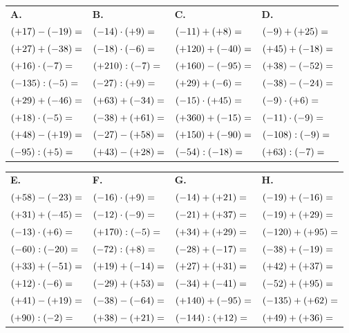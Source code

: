 {\small
\bigskip
\def\arraystretch{1.2}
\begin{tabularx}{\linewidth}{*{4}{X}}
\textbf{A.} & \textbf{B.} & \textbf{C.} & \textbf{D.} \\
$(+17)-(-19)= \dotfill$ & $(-14)\cdot(+9)= \dotfill$ & $(-11)+(+8)= \dotfill$ & $(-9)+(+25)= \dotfill$ \\
$(+27)+(-38)= \dotfill$ & $(-18)\cdot(-6)= \dotfill$ & $(+120)+(-40)= \dotfill$ & $(+45)+(-18)= \dotfill$ \\
$(+16)\cdot(-7)= \dotfill$ & $(+210):(-7)= \dotfill$ & $(+160)-(-95)= \dotfill$ & $(+38)-(-52)= \dotfill$ \\
$(-135):(-5)= \dotfill$ & $(-27):(+9)= \dotfill$ & $(+29)+(-6)= \dotfill$ & $(-38)-(-24)= \dotfill$ \\
$(+29)+(-46)= \dotfill$ & $(+63)+(-34)= \dotfill$ & $(-15)\cdot(+45)= \dotfill$ & $(-9)\cdot(+6)= \dotfill$ \\
$(+18)\cdot(-5)= \dotfill$ & $(-38)+(+61)= \dotfill$ & $(+360)+(-15)= \dotfill$ & $(-11)\cdot(-9)= \dotfill$ \\
$(+48)-(+19)= \dotfill$ & $(-27)-(+58)= \dotfill$ & $(+150)+(-90)= \dotfill$ & $(-108):(-9)= \dotfill$ \\
$(-95):(+5)= \dotfill$ & $(+43)-(+28)= \dotfill$ & $(-54):(-18)= \dotfill$ & $(+63):(-7)= \dotfill$ \\
\end{tabularx}

\bigskip
\begin{tabularx}{\linewidth}{*{4}{X}}
\textbf{E.} & \textbf{F.} & \textbf{G.} & \textbf{H.} \\
$(+58)-(-23)= \dotfill$ & $(-16)\cdot(+9)= \dotfill$ & $(-14)+(+21)= \dotfill$ & $(-19)+(-16)= \dotfill$ \\
$(+31)+(-45)= \dotfill$ & $(-12)\cdot(-9)= \dotfill$ & $(-21)+(+37)= \dotfill$ & $(-19)+(+29)= \dotfill$ \\
$(-13)\cdot(+6)= \dotfill$ & $(+170):(-5)= \dotfill$ & $(+34)+(+29)= \dotfill$ & $(-120)+(+95)= \dotfill$ \\
$(-60):(-20)= \dotfill$ & $(-72):(+8)= \dotfill$ & $(-28)+(-17)= \dotfill$ & $(-38)+(-19)= \dotfill$ \\
$(+33)+(-51)= \dotfill$ & $(+19)+(-14)= \dotfill$ & $(+27)+(+31)= \dotfill$ & $(+42)+(+37)= \dotfill$ \\
$(+12)\cdot(-6)= \dotfill$ & $(-29)+(+53)= \dotfill$ & $(-34)+(-41)= \dotfill$ & $(-52)+(+95)= \dotfill$ \\
$(+41)-(+19)= \dotfill$ & $(-38)-(-64)= \dotfill$ & $(+140)+(-95)= \dotfill$ & $(-135)+(+62)= \dotfill$ \\
$(+90):(-2)= \dotfill$ & $(+38)-(+21)= \dotfill$ & $(-144):(+12)= \dotfill$ & $(+49)+(+36)= \dotfill$ \\
\end{tabularx}

}

